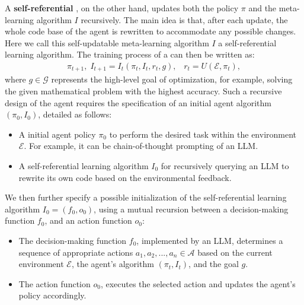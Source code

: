 A \textbf{self-referential \framework}, on the other hand, updates both the policy $\pi$ and the meta-learning algorithm $I$ recursively. The main idea is that, after each update, the whole code base of the agent is rewritten to accommodate any possible changes. Here we call this self-updatable meta-learning algorithm $I$ a self-referential learning algorithm. The training process of a \framework can then be written as:
\begin{align*}
    \pi_{t+1}, \; I_{t+1} = I_t(\pi_t, I_t, r_t, g),\;\;\; r_t = U(\mathcal{E}, \pi_t),
\end{align*}
where $g \in \mathcal{G}$ represents the high-level goal of optimization, for example, solving the given mathematical problem with the highest accuracy. Such a recursive design of the agent requires the specification of an initial agent algorithm $(\pi_0, I_0)$, detailed as follows:
\begin{itemize}[leftmargin=*,itemsep=1pt]
    \item A initial agent policy $\pi_0$ to perform the desired task within the environment $\mathcal{E}$. For example, it can be chain-of-thought prompting of an LLM.
    \item A self-referential learning algorithm $I_0$ for recursively querying an LLM to rewrite its own code based on the environmental feedback.
\end{itemize}
We then further specify a possible initialization of the self-referential learning algorithm $I_0 = (f_0, o_0)$, using a mutual recursion between a decision-making function $f_0$, and an action function $o_0$:
\begin{itemize}[leftmargin=*,itemsep=1pt]
    \item The decision-making function $f_0$, implemented by an LLM, determines a sequence of appropriate actions $a_1, a_2, ..., a_n \in \mathcal{A}$ based on the current environment $\mathcal{E}$, the agent's algorithm $(\pi_t, I_t)$, and the goal $g$.
    \item The action function $o_0$, executes the selected action and updates the agent's policy accordingly. 
\end{itemize}



